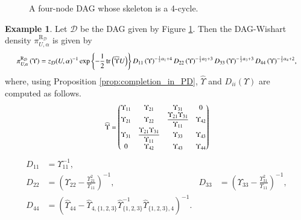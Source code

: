 \documentclass[12pt]{article}
\DeclareMathOperator{\tr}{tr}
\newcommand{\D}{\mathcal{D}}
\theoremstyle{plain}
\theoremstyle{definition}
\newtheorem{Ex}[theorem]{Example}
\theoremstyle{remark}
\begin{document}
 \begin{figure}[H]
   \centering
   \caption{A four-node DAG whose skeleton is a 4-cycle.}
   \label{fig-4}
 \end{figure}

 
 \begin{Ex}
 Let $\D$ be the DAG given by Figure \ref{fig-4}. Then the DAG-Wishart density $\pi_{U,\alpha}^{\mathrm{R}_{\D}}$ is given by
 \[
 \scalebox{.85}{$\displaystyle
 \pi_{U,\alpha}^{\mathrm{R}_{\D}}\left(\Upsilon\right)=
 z_{\D}(U,\alpha)^{-1}\exp\left\{-\frac{1}{2}\tr\left(\widehat{\Upsilon}U \right)\right\}D_{11}\left(\Upsilon\right)^ {-\frac{1}{2}\alpha_1+4}D_{22}\left(\Upsilon\right)^ {-\frac{1}{2}\alpha_2+3}D_{33}\left(\Upsilon\right)^ {-\frac{1}{2}\alpha_3+3}D_{44}\left(\Upsilon\right)^ {-\frac{1}{2}\alpha_4+2}$,}
 \]
 where, using Proposition \ref{prop:completion_in_PD}, $\widehat{\Upsilon}$ and $D_{ii}\left(\Upsilon\right)$ are computed as follows. 
 \[
 \scalebox{.83}{$\displaystyle
\widehat{\Upsilon}=
 \begin{pmatrix}
 \Upsilon_{11} & \Upsilon_{21} & \Upsilon_{31} & 0 \\
 \Upsilon_{21} & \Upsilon_{22} & \dfrac{\Upsilon_{21}\Upsilon_{31}}{\Upsilon_{11}} & \Upsilon_{42} \\
 \Upsilon_{31} & \dfrac{\Upsilon_{21}\Upsilon_{31}}{\Upsilon_{11}}& \Upsilon_{33} & \Upsilon_{43} \\
 0 & \Upsilon_{42} & \Upsilon_{43} & \Upsilon_{44}
 \end{pmatrix}
 $}
 \]
 \[
\begin{aligned}
 D_{11}&=\Upsilon_{11}^{-1},\\
 D_{22}&=\left(\Upsilon_{22}-\frac{\Upsilon_{21}^{2}}{\Upsilon_{11}}\right)^{-1},
 &D_{33}&=\left(\Upsilon_{33}-\frac{\Upsilon_{31}^{2}}{\Upsilon_{11}}\right)^{-1},\\
 D_{44}&=\left(
 \widehat\Upsilon_{44}
 -\widehat\Upsilon_{4,\{1,2,3\}}
  \widehat\Upsilon_{\{1,2,3\}}^{-1}
  \widehat\Upsilon_{\{1,2,3\},4}
 \right)^{-1}.
\end{aligned}
\]
 \end{Ex}
 \medskip
 
\end{document}

